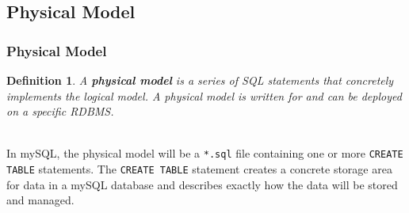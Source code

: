 \documentclass[aspectratio=169]{beamer}
\newtheorem{defn}{Definition}
\begin{document}
\subsection{Physical Model}
\begin{frame}
\frametitle{Physical Model}
\begin{defn}
A \textbf{physical model} is a series of SQL statements that concretely implements the logical model. A physical model is written for and can be deployed on a specific RDBMS.
\end{defn}
\pause
\mbox{}\\
In mySQL, the physical model will be a \texttt{*.sql} file containing one or more \texttt{CREATE TABLE} statements. The \texttt{CREATE TABLE} statement creates a concrete storage area for data in a mySQL database and describes exactly how the data will be stored and managed.
\end{frame}
\end{document}
